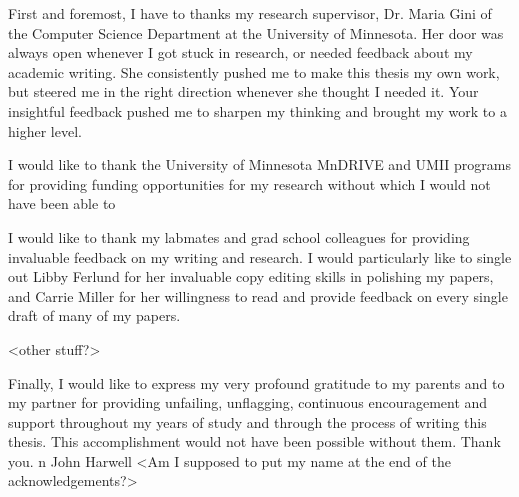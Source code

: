 
First and foremost, I have to thanks my research supervisor, Dr. Maria Gini of
the Computer Science Department at the University of Minnesota. Her door was
always open whenever I got stuck in research, or needed feedback about my
academic writing. She consistently pushed me to make this thesis my own work,
but steered me in the right direction whenever she thought I needed it. Your
insightful feedback pushed me to sharpen my thinking and brought my work to a
higher level.

I would like to thank the University of Minnesota MnDRIVE and UMII programs for
providing funding opportunities for my research without which I would not have
been able to

I would like to thank my labmates and grad school colleagues for providing
invaluable feedback on my writing and research. I would particularly like to
single out Libby Ferlund for her invaluable copy editing skills in polishing my
papers, and Carrie Miller for her willingness to read and provide feedback on
every single draft of many of my papers.

<other stuff?>

Finally, I would like to express my very profound gratitude to my parents and to
my partner for providing unfailing, unflagging, continuous encouragement and
support throughout my years of study and through the process of writing this
thesis. This accomplishment would not have been possible without them. Thank
you.
n
John Harwell <Am I supposed to put my name at the end of the acknowledgements?>

